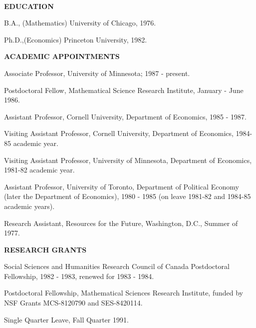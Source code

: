 \documentclass[12pt]{article}
\begin{document}
\ \\
\noindent
{\bf EDUCATION}
\begin{description}
\item
B.A., (Mathematics) University of Chicago, 1976.
\item
Ph.D.,(Economics) Princeton University, 1982.
\end{description}

\noindent
{\bf ACADEMIC APPOINTMENTS}
\begin{description}
\item
Associate Professor, University of Minnesota; 1987 - present. 
\item
Postdoctoral Fellow, Mathematical Science Research Institute, January -
June 1986.
\item
Assistant Professor, Cornell University, Department of
Economics, 1985 - 1987.
\item
Visiting Assistant Professor, Cornell University,
Department of Economics, 1984-85 academic year.
\item
Visiting Assistant Professor, University of Minnesota,
Department of               Economics, 1981-82 academic year.
\item
Assistant Professor, University of Toronto, Department
of Political Economy (later the Department of Economics), 
1980 - 1985 (on leave 1981-82 and 1984-85 academic years).
\item
Research Assistant, Resources for the Future, 
Washington, D.C., Summer of 1977.
\end{description}

\noindent
{\bf RESEARCH GRANTS} 
\begin{description}
\item
Social Sciences and Humanities Research Council of Canada
Postdoctoral Fellowship, 1982 - 1983, renewed for 1983 - 1984.
\item
Postdoctoral Fellowship, Mathematical Sciences Research Institute,
funded by NSF Grants MCS-8120790 and SES-8420114.
\item
Single Quarter Leave, Fall Quarter 1991.
\end{description}
\end{document}
